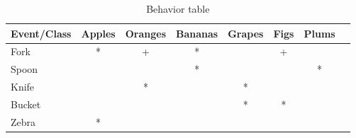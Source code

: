 \begin{table}[H]
    \centering
    \begin{tabular}{|l|c|c|c|c|c|c|c|}
    \hline      
         Event/Class    & Apples   & Oranges  & Bananas & Grapes   & Figs    & Plums \\\hline
         Fork           &    *     &    +     &    *    &          &    +    &       \\\hline
         Spoon          &          &          &    *    &          &         &   *   \\\hline
         Knife          &          &    *     &         &    *     &         &       \\\hline
         Bucket         &          &          &         &    *     &    *    &       \\\hline
         Zebra          &    *     &          &         &          &         &       \\\hline
    \end{tabular}
    \caption{Behavior table}
    \label{tab:behavior_table}
\end{table}


